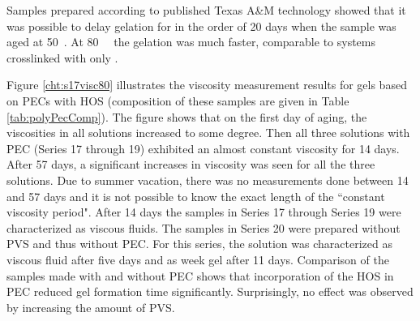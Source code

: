 \documentclass[nanomaterials,article,submit,moreauthors,pdftex]{Definitions/mdpi}
\begin{document}
Samples prepared according to published Texas A\&M technology showed that it was possible to delay gelation for in the order of 20 days when the sample was aged at 50~\celsius. At 80~\celsius~ the gelation was much faster, comparable to systems crosslinked with only .



Figure \ref{cht:s17visc80} illustrates the viscosity measurement results for gels based on PECs with HOS (composition of these samples are given in Table \ref{tab:polyPecComp}). The figure shows that on the first day of aging, the viscosities in all solutions increased to some degree. Then all three solutions with PEC (Series 17 through 19) exhibited an almost constant viscosity for 14 days. After 57 days, a significant increases in viscosity was seen for all the three solutions. Due to summer vacation, there was no measurements done between 14 and 57 days and it is not possible to know the exact length of the ``constant viscosity period". After 14 days the samples in Series 17 through Series 19 were characterized as viscous fluids. The samples in Series 20 were prepared without PVS and thus without PEC. For this series, the solution was characterized as viscous fluid after five days and as week gel after 11 days. Comparison of the samples made with and without PEC shows that incorporation of the HOS in PEC reduced gel formation time significantly. Surprisingly, no effect was observed by increasing the amount of PVS.
\end{document}
